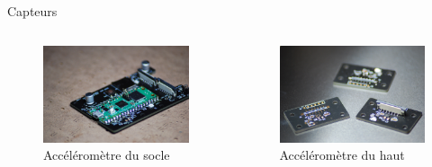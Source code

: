 \documentclass{beamer}
\begin{document}
	\begin{frame}{Capteurs}
		
		
		\begin{columns}
			\begin{column}{0.35\textwidth}
				\begin{figure}
					\includegraphics[width=\textwidth]{Image/Carte principale belle photo.JPG}
					\caption{Accéléromètre du socle}
				\end{figure}
			\end{column}
			\begin{column}{0.35\textwidth}
				\begin{figure}
					\includegraphics[width=\textwidth]{Image/Accéléromètre haut belle photo.JPG}
					\caption{Accéléromètre du haut}
				\end{figure}

\end{column}
\end{columns}
\end{frame}
\end{document}
